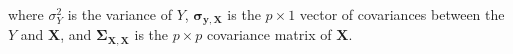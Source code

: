 \noindent where
$\sigma_{Y}^{2}$
is the variance of $Y$,
$\boldsymbol{\sigma}_{\mathbf{y}, \mathbf{X}}$
is the
$p \times 1$
vector of covariances
between the $Y$ and $\mathbf{X}$,
and
$\boldsymbol{\Sigma}_{\mathbf{X}, \mathbf{X}}$
is the
$p \times p$
covariance matrix of $\mathbf{X}$.